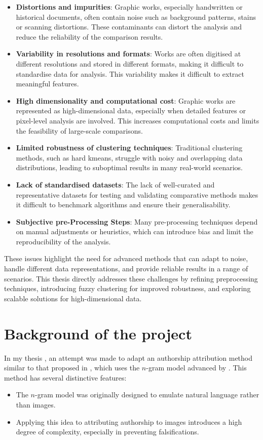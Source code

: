 \begin{toReview}
		\begin{itemize}
			\item \textbf{Distortions and impurities}: Graphic works, especially handwritten or historical documents, often contain noise such as background patterns, stains or scanning distortions. These contaminants can distort the analysis and reduce the reliability of the comparison results.
			\item \textbf{Variability in resolutions and formats}: Works are often digitised at different resolutions and stored in different formats, making it difficult to standardise data for analysis. This variability makes it difficult to extract meaningful features.
			\item \textbf{High dimensionality and computational cost}: Graphic works are represented as high-dimensional data, especially when detailed features or pixel-level analysis are involved. This increases computational costs and limits the feasibility of large-scale comparisons.
			\item \textbf{Limited robustness of clustering techniques}: Traditional clustering methods, such as hard \gls{kmeans}, struggle with noisy and overlapping data distributions, leading to suboptimal results in many real-world scenarios.
			\item \textbf{Lack of standardised datasets}: The lack of well-curated and representative datasets for testing and validating comparative methods makes it difficult to benchmark algorithms and ensure their generalisability.
			\item \textbf{Subjective pre-Processing Steps}: Many pre-processing techniques depend on manual adjustments or heuristics, which can introduce bias and limit the reproducibility of the analysis.
		\end{itemize}

		\noindent These issues highlight the need for advanced methods that can adapt to noise, handle different data representations, and provide reliable results in a range of scenarios. This thesis directly addresses these challenges by refining preprocessing techniques, introducing fuzzy clustering for improved robustness, and exploring scalable solutions for high-dimensional data.

	\section{Background of the project}
		In my thesis \cite{thesis}, an attempt was made to adapt an authorship attribution method similar to that proposed in \cite{SapAttribution}, which uses the $n$-gram model advanced by \citet{Shannon_ngrammodel}. This method has several distinctive features:
		\begin{itemize}
			\item The $n$-gram model was originally designed to emulate natural language rather than images.
			\item Applying this idea to attributing authorship to images introduces a high degree of complexity, especially in preventing falsifications.
		\end{itemize}


\end{toReview}
